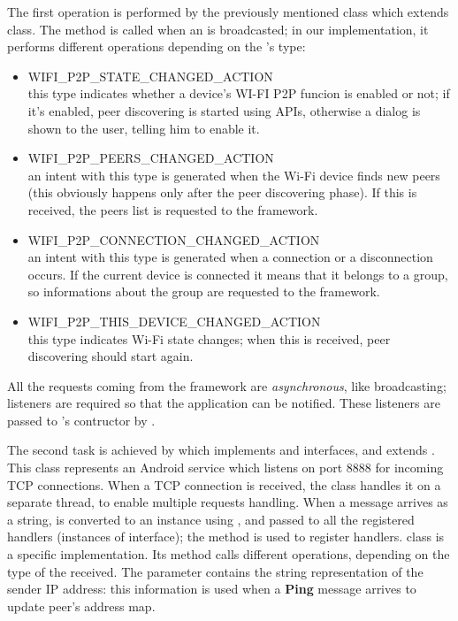 	The first operation is performed by the previously mentioned  class which extends  class. The method  is called when an  is broadcasted; in our implementation, it performs different operations depending on the 's type:
	\begin{itemize}
		\item WIFI\_P2P\_STATE\_CHANGED\_ACTION \hfill \\
		this type indicates whether a device's WI-FI P2P funcion is enabled or not; if it's enabled, peer discovering is started using \direct APIs, otherwise a dialog is shown to the user, telling him to enable it.
		\item WIFI\_P2P\_PEERS\_CHANGED\_ACTION \hfill \\
		an intent with this type is generated when the Wi-Fi device finds new peers (this obviously happens only after the peer discovering phase). If this  is received, the peers list is requested to the \direct framework.
		\item WIFI\_P2P\_CONNECTION\_CHANGED\_ACTION \hfill \\
		an intent with this type is generated when a connection or a disconnection occurs. If the current device is connected it means that it belongs to a \direct group, so informations about the group are requested to the \direct framework.
		\item WIFI\_P2P\_THIS\_DEVICE\_CHANGED\_ACTION \hfill \\
		this type indicates Wi-Fi state changes; when this  is received, peer discovering should start again.
	\end{itemize}

All the requests coming from the \direct framework are \textit{asynchronous}, like  broadcasting; listeners are required so that the application can be notified. These listeners are passed to 's contructor by .
	
	The second task is achieved by  which implements  and  interfaces, and extends . This class represents an Android service which listens on port 8888 for incoming TCP connections. When a TCP connection is received, the class handles it on a separate thread, to enable multiple requests handling. When a message arrives as a string, is converted to an  instance using , and passed to all the registered handlers (instances of  interface); the method  is used to register handlers.
	 class is a specific  implementation. Its method  calls different  operations, depending on the type of the received. The parameter  contains the string representation of the sender IP address: this information is used when a \textbf{Ping} message arrives to update peer's address map.
	\\
